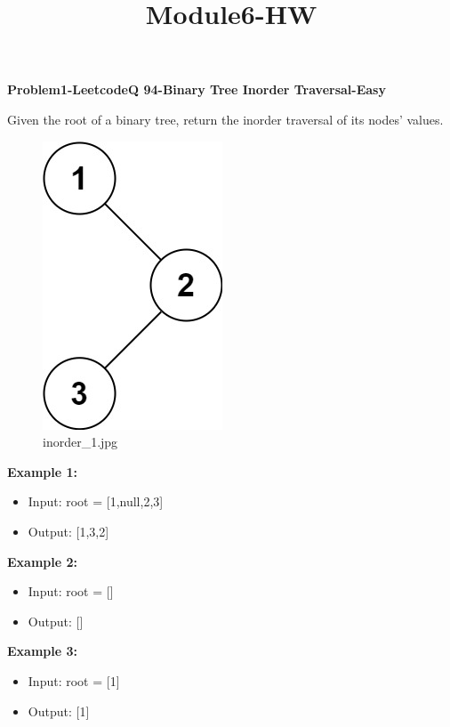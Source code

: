 \documentclass[11pt]{article}
\title{Module6-HW}
\providecommand{\tightlist}{%
      \setlength{\itemsep}{0pt}\setlength{\parskip}{0pt}}
\begin{document}
    
    \maketitle
    
    

    
    \textbf{Problem1-LeetcodeQ 94-Binary Tree Inorder Traversal-Easy}

Given the root of a binary tree, return the inorder traversal of its
nodes' values.

\begin{figure}
\centering
\includegraphics{ea7f99ce-c083-4a90-80d8-1f187e897165.jpg}
\caption{inorder\_1.jpg}
\end{figure}

\textbf{Example 1:}

\begin{itemize}
\tightlist
\item
  Input: root = {[}1,null,2,3{]}
\item
  Output: {[}1,3,2{]}
\end{itemize}

\textbf{Example 2:}

\begin{itemize}
\tightlist
\item
  Input: root = {[}{]}
\item
  Output: {[}{]}
\end{itemize}

\textbf{Example 3:}

\begin{itemize}
\tightlist
\item
  Input: root = {[}1{]}
\item
  Output: {[}1{]}
\end{itemize}
\end{document}
